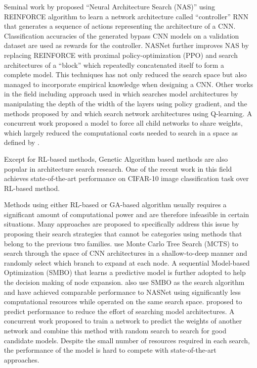 \documentclass[runningheads]{llncs}
\begin{document}
Seminal work by \cite{zoph2016neural} proposed ``Neural Architecture Search (NAS)'' using REINFORCE algorithm \cite{Williams:1992:SSG:139611.139614} to learn a network architecture called ``controller'' RNN that generates a sequence of actions representing the architecture of a CNN. Classification accuracies of the generated bypass CNN models on a validation dataset are used as rewards for the controller. NASNet \cite{zoph2017learning} further improves NAS by replacing REINFORCE with proximal policy-optimization (PPO) \cite{schulman2017proximal} and search architectures of a ``block'' which repeatedly concatenated itself to form a complete model. This techniques has not only reduced the search space but also managed to incorporate empirical knowledge when designing a CNN. Other works in the field including approach used in \cite{cai2018efficient} which searches model architectures by manipulating the depth of the width of the layers using policy gradient, and the methods proposed by \cite{baker2016designing} and \cite{zhong2017practical} which search network architectures using Q-learning. A concurrent work \cite{pham2018efficient} proposed a model to force all child networks to share weights, which largely reduced the computational costs needed to search in a space as defined by \cite{zoph2017learning}.

Except for RL-based methods, Genetic Algorithm based methods \cite{real2017large,xie2017genetic,liu2017hierarchical} are also popular in architecture search research. One of the recent work in this field \cite{real2018regularized} achieves state-of-the-art performance on CIFAR-10 image classification task over RL-based method.

Methods using either RL-based or GA-based algorithm usually requires a significant amount of computational power and are therefore infeasible in certain situations. Many approaches are proposed to specifically address this issue by proposing their search strategies that cannot be categories using methods that belong to the previous two families. \cite{negrinho2017deeparchitect} use Monte Carlo Tree Search (MCTS) to search through the space of CNN architectures in a shallow-to-deep manner and randomly select which branch to expand at each node. A sequential Model-based Optimization (SMBO) \cite{hutter2011sequential} that learns a predictive model is further adopted to help the decision making of node expansion. \cite{liu2017progressive} also use SMBO as the search algorithm and have achieved comparable performance to NASNet using significantly less computational resources while operated on the same search space. \cite{baker2018accelerating} proposed to predict performance to reduce the effort of searching model architectures. A concurrent work \cite{brock2017smash} proposed to train a network to predict the weights of another network and combine this method with random search to search for good candidate models. Despite the small number of resources required in each search, the performance of the model is hard to compete with state-of-the-art approaches.
\end{document}
